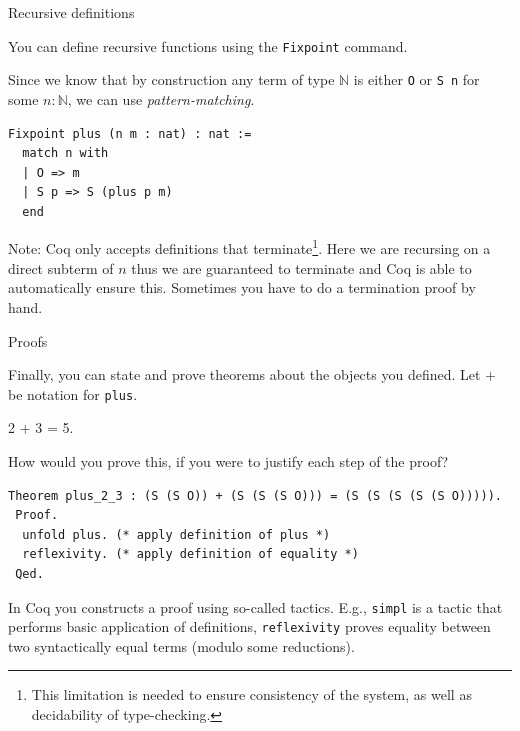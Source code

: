 \documentclass[10pt]{beamer}
\begin{document}
\begin{frame}[fragile]{Recursive definitions}

  You can define recursive functions using the \texttt{Fixpoint} command.

  Since we know that by construction any term of type $\mathbb{N}$ is either \texttt{O} or \texttt{S n} for some $n : \mathbb{N}$, we can use {\it pattern-matching}.
  
   \begin{lstlisting}[language=Coq]
  Fixpoint plus (n m : nat) : nat :=
  match n with
  | O => m
  | S p => S (plus p m)
  end
   \end{lstlisting}
   
Note: Coq only accepts definitions that terminate\footnote{This limitation is needed to ensure consistency of the system, as well as decidability of type-checking.}. Here we are recursing on a direct subterm of $n$ thus we are guaranteed to terminate and Coq is able to automatically ensure this. Sometimes you have to do a termination proof by hand. 
\end{frame}


\begin{frame}[fragile]{Proofs}


  Finally, you can state and prove theorems about the objects you defined. Let $+$ be notation for \texttt{plus}.

  \begin{theorem} 2 + 3 = 5.
    \end{theorem}

  How would you prove this, if you were to justify each step of the proof?
  
  \begin{lstlisting}[language=Coq]
Theorem plus_2_3 : (S (S O)) + (S (S (S O))) = (S (S (S (S (S O))))).
 Proof.
  unfold plus. (* apply definition of plus *)
  reflexivity. (* apply definition of equality *)
 Qed.

  \end{lstlisting}
  In Coq you constructs a proof using so-called {\sf tactics}.
  E.g., \texttt{simpl} is a tactic that performs basic application of definitions, \texttt{reflexivity} proves equality between two syntactically equal terms (modulo some reductions).  
 
\end{frame}
\end{document}
